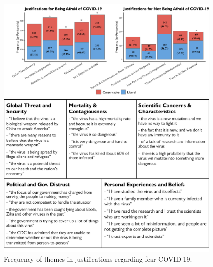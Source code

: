 \documentclass{article} %
\begin{document}
\begin{figure}[!htbp]
  \captionsetup{justification=raggedright,singlelinecheck=false}
  \caption{Frequency of themes in justifications regarding fear COVID-19.}
  \label{fig:partisan7}
  \centering
  \includegraphics[width=\textwidth]{./figures/media/image13.png}

  \vspace{1cm}

  \label{tab:afraid}
  \centering
  \includegraphics[width=\textwidth]{./figures/media/Table5.png}
\end{figure}
\end{document}
